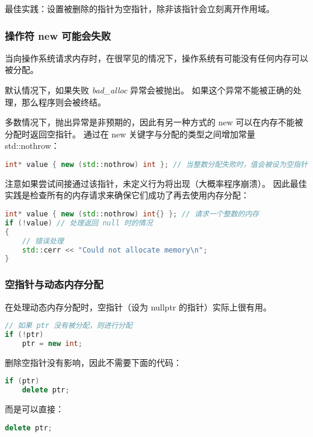 \documentclass[../../LearnCpp.tex]{subfiles}
\begin{document}
最佳实践：设置被删除的指针为空指针，除非该指针会立刻离开作用域。

\subsubsection*{操作符 new 可能会失败}

当向操作系统请求内存时，在很罕见的情况下，操作系统有可能没有任何内存可以被分配。

默认情况下，如果失败 \textit{bad\_alloc} 异常会被抛出。
如果这个异常不能被正确的处理，那么程序则会被终结。

多数情况下，抛出异常是非预期的，因此有另一种方式的 new 可以在内存不能被分配时返回空指针。
通过在 new 关键字与分配的类型之间增加常量 std::nothrow：

\begin{lstlisting}[language=C++]
int* value { new (std::nothrow) int }; // 当整数分配失败时，值会被设为空指针
\end{lstlisting}

注意如果尝试间接通过该指针，未定义行为将出现（大概率程序崩溃）。
因此最佳实践是检查所有的内存请求来确保它们成功了再去使用内存分配：

\begin{lstlisting}[language=C++]
int* value { new (std::nothrow) int{} }; // 请求一个整数的内存
if (!value) // 处理返回 null 时的情况
{
    // 错误处理
    std::cerr << "Could not allocate memory\n";
}
\end{lstlisting}

\subsubsection*{空指针与动态内存分配}

在处理动态内存分配时，空指针（设为 nullptr 的指针）实际上很有用。

\begin{lstlisting}[language=C++]
// 如果 ptr 没有被分配，则进行分配
if (!ptr)
    ptr = new int;
\end{lstlisting}

删除空指针没有影响，因此不需要下面的代码：

\begin{lstlisting}[language=C++]
if (ptr)
    delete ptr;
\end{lstlisting}

而是可以直接：

\begin{lstlisting}[language=C++]
delete ptr;
\end{lstlisting}
\end{document}
